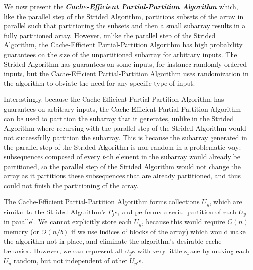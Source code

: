 \documentclass[twocolumn, twoside, 11pt]{article}
\newcommand{\defn}[1]       {{\textit{\textbf{\boldmath #1}}}}
\renewcommand{\paragraph}[1]{\vspace{0.09in}\noindent{\bf \boldmath #1.}}
\begin{document}
\paragraph{Algorithm Concept}
We now present the \defn{Cache-Efficient Partial-Partition Algorithm} which, like the parallel step of the Strided Algorithm, partitions subsets of the array in parallel such that partitioning the subsets and then a small subarray results in a fully partitioned array. 
However, unlike the parallel step of the Strided Algorithm, the Cache-Efficient Partial-Partition Algorithm has high probability guarantees on the size of the unpartitioned subarray for arbitrary inputs. 
The Strided Algorithm has guarantees on some inputs, for instance randomly ordered inputs, but the Cache-Efficient Partial-Partition Algorithm uses randomization in the algorithm to obviate the need for any specific type of input. 

Interestingly, because the Cache-Efficient Partial-Partition Algorithm has guarantees on arbitrary inputs, the Cache-Efficient Partial-Partition Algorithm can be used to partition the subarray that it generates, unlike in the Strided Algorithm where recursing with the parallel step of the Strided Algorithm would not successfully partition the subarray.
This is because the subarray generated in the parallel step of the Strided Algorithm is non-random in a problematic way: subsequences composed of every $t$-th element in the subarray would already be partitioned, so the parallel step of the Strided Algorithm would not change the array as it partitions these subsequences that are already partitioned, and thus could not finish the partitioning of the array.

The Cache-Efficient Partial-Partition Algorithm forms collections $U_y$, which are similar to the Strided Algorithm's $P_j$s, and performs a serial partition of each $U_y$ in parallel.
We cannot explicitly store each $U_y$, because this would require $O(n)$ memory (or $O(n/b)$ if we use indices of blocks of the array) which would make the algorithm not in-place, and eliminate the algorithm's desirable cache behavior. 
However, we can represent all $U_y$s with very little space by making each $U_y$ random, but not independent of other $U_{y'}$s. 
\end{document}
